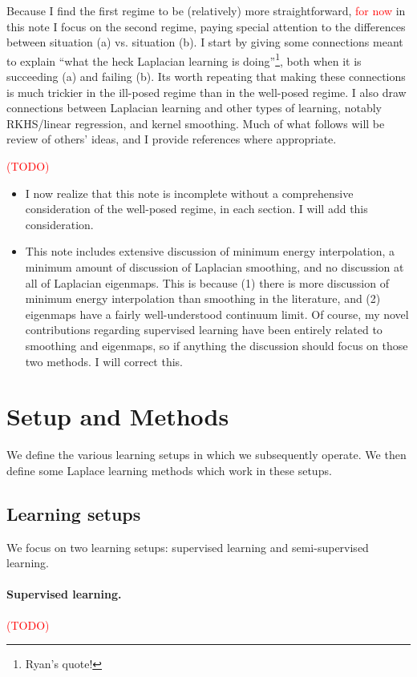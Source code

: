 \documentclass{article}
\newcommand{\1}{\mathbf{1}}
\theoremstyle{definition}
\theoremstyle{remark}
\begin{document}
Because I find the first regime to be (relatively) more straightforward, \textcolor{red}{for now} in this note I focus on the second regime, paying special attention to the differences between situation (a) vs. situation (b). I start by giving some connections meant to explain ``what the heck Laplacian learning is doing''\footnote{Ryan's quote!}, both when it is succeeding (a) and failing (b). Its worth repeating that making these connections is much trickier in the ill-posed regime than in the well-posed regime. I also draw connections between Laplacian learning and other types of learning, notably RKHS/linear regression, and kernel smoothing. Much of what follows will be review of others' ideas, and I provide references where appropriate.

\textcolor{red}{(TODO)}
\begin{itemize}
	\item I now realize that this note is incomplete without a comprehensive consideration of the well-posed regime, in each section. I will add this consideration.
	\item This note includes extensive discussion of minimum energy interpolation, a minimum amount of discussion of Laplacian smoothing, and no discussion at all of Laplacian eigenmaps. This is because (1) there is more discussion of minimum energy interpolation than smoothing in the literature, and (2) eigenmaps have a fairly well-understood continuum limit. Of course, my novel contributions regarding supervised learning have been entirely related to smoothing and eigenmaps, so if anything the discussion should focus on those two methods. I will correct this.
\end{itemize}

\section{Setup and Methods}

We define the various learning setups in which we subsequently operate. We then define some Laplace learning methods which work in these setups.

\subsection{Learning setups}
We focus on two learning setups: supervised learning and semi-supervised learning.

\paragraph{Supervised learning.}
\textcolor{red}{(TODO)}
\end{document}

